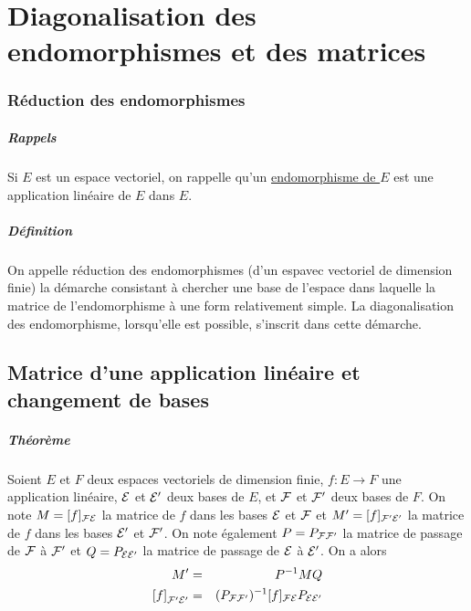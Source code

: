 \chapter{Diagonalisation des endomorphismes et des matrices}

%
\subsection{Réduction des endomorphismes}
%
\paragraph{Rappels} Si $E$ est un espace vectoriel, on rappelle qu'un \underline{endomorphisme de $E$} est une application linéaire de $E$ dans $E$.

\paragraph{Définition} On appelle réduction des endomorphismes (d'un espavec vectoriel de dimension finie) la démarche consistant à chercher une base de l'espace dans laquelle la matrice de l'endomorphisme à une form relativement simple. La diagonalisation des endomorphisme, lorsqu'elle est possible, s'inscrit dans cette démarche.

%
%
\section{Matrice d'une application linéaire et changement de bases}
%
%

\paragraph{Théorème} Soient $E$ et $F$ deux espaces vectoriels de dimension finie, $f: E \rightarrow F$ une application linéaire, $\mathcal{E}$ et $\mathcal{E}'$ deux bases de $E$, et $\mathcal{F}$ et $\mathcal{F}'$ deux bases de $F$. On note $M = [f]_{\mathcal{F} \mathcal{E}}$ la matrice de $f$ dans les bases $\mathcal{E}$ et $\mathcal{F}$ et $M' = [f]_{\mathcal{F}' \mathcal{E}'}$ la matrice de $f$ dans les bases $\mathcal{E}'$ et $\mathcal{F}'$. On note également $P = P_{\mathcal{F} \mathcal{F}'}$ la matrice de passage de $\mathcal{F}$ à $\mathcal{F}'$ et $Q = P_{\mathcal{E} \mathcal{E}'}$ la matrice de passage de $\mathcal{E}$ à $\mathcal{E}'$. On a alors 
\begin{eqnarray*}
  M' &=& P^{-1} M Q \\
  \left[f\right]_{\mathcal{F}' \mathcal{E}'} &=& (P_{\mathcal{F} \mathcal{F}'})^{-1} [f]_{\mathcal{F} \mathcal{E}} P_{\mathcal{E} \mathcal{E}'}
\end{eqnarray*}


